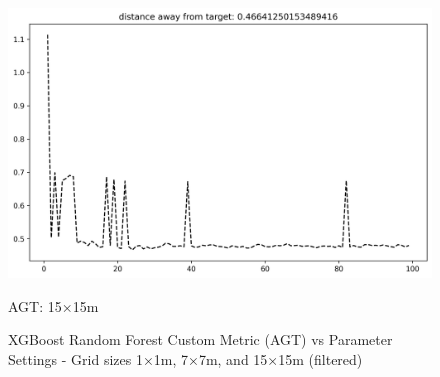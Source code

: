 \documentclass[runningheads]{llncs}
\begin{document}
\begin{figure}[H]
\begin{minipage}{0.32\textwidth}
		\includegraphics[width=\textwidth]{figures/xgbrf_custom_15.png}
		\caption*{AGT: 15×15m}
	\end{minipage}
	\caption{XGBoost Random Forest Custom Metric (AGT) vs Parameter Settings - Grid sizes 1×1m, 7×7m, and 15×15m (filtered)}
\end{figure}
\end{document}
